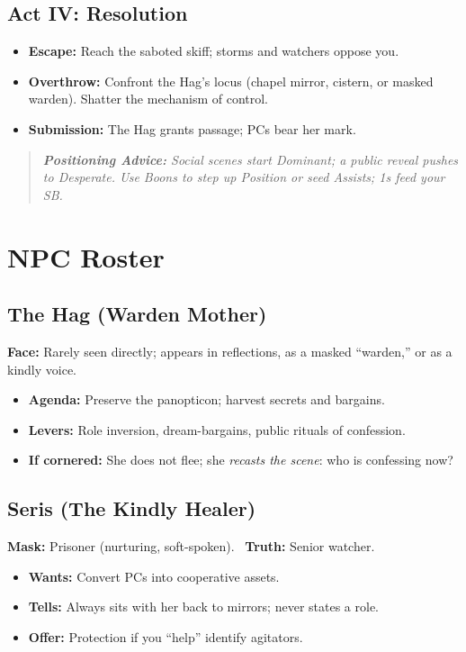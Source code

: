 \documentclass[11pt]{article}
\newenvironment{callout}
{\begin{quote}\itshape\small\color{gray!40!black}}
{\end{quote}}
\begin{document}
\subsection{Act IV: Resolution}
\begin{itemize}
  \item \textbf{Escape:} Reach the saboted skiff; storms and watchers oppose you.
  \item \textbf{Overthrow:} Confront the Hag's locus (chapel mirror, cistern, or masked warden). Shatter the mechanism of control.
  \item \textbf{Submission:} The Hag grants passage; PCs bear her mark.
\end{itemize}

\begin{callout}
\textbf{Positioning Advice:} Social scenes start \emph{Dominant}; a public reveal pushes to \emph{Desperate}. Use Boons to step up Position or seed Assists; 1s feed your SB.
\end{callout}

\section{NPC Roster}
\subsection{The Hag (Warden Mother)}
\textbf{Face:} Rarely seen directly; appears in reflections, as a masked ``warden,'' or as a kindly voice.
\begin{itemize}
  \item \textbf{Agenda:} Preserve the panopticon; harvest secrets and bargains.
  \item \textbf{Levers:} Role inversion, dream-bargains, public rituals of confession.
  \item \textbf{If cornered:} She does not flee; she \emph{recasts the scene}: who is confessing now?
\end{itemize}

\subsection{Seris (The Kindly Healer)}
\textbf{Mask:} Prisoner (nurturing, soft-spoken). \ \textbf{Truth:} Senior watcher.
\begin{itemize}
  \item \textbf{Wants:} Convert PCs into cooperative assets.
  \item \textbf{Tells:} Always sits with her back to mirrors; never states a role.
  \item \textbf{Offer:} Protection if you ``help'' identify agitators.
\end{itemize}
\end{document}
